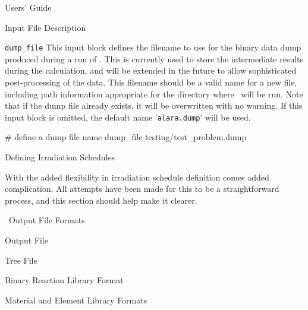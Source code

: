\begin{chapter}{Users' Guide\label{app:user.guide}}
\begin{section}{Input File Description\label{app:user.input}}
\begin{subsection}{\texttt{dump\_file}\label{sec:user.input.dump}}
      This input block defines the filename to use for the binary data
      dump produced during a run of \ALARA.  This is currently used to
      store the intermediate results during the calculation, and will
      be extended in the future to allow sophisticated post-processing
      of the data.  This filename should be a valid name for a new
      file, including path information appropriate for the directory
      where \ALARA\ will be run.  Note that if the dump file already
      exists, it will be overwritten with no warning.  If this input
      block is omitted, the default name '\texttt{alara.dump}' will be
      used.

      \begin{center}
        \renewcommand{\baselinestretch}{1}\normalsize
        \begin{boxedverbatim}
# define a dump file name
dump_file testing/test_problem.dump          
\end{boxedverbatim}
      \end{center}

    \end{subsection}

  \end{section}
  
  \begin{section}{Defining Irradiation Schedules\label{app:user.schedules}}
    
    With the added flexibility in irradiation schedule definition
    comes added complication.  All attempts have been made for this to
    be a straightforward process, and this section should help make it
    clearer.

  \end{section}

  \begin{section}{\ALARA\ Output File Formats\label{app:user.output}}

    \begin{subsection}{Output File}
      
    \end{subsection}

    \begin{subsection}{Tree File\label{app:user.output.tree}}
      
    \end{subsection}
    
  \end{section}


  \begin{section}{Binary Reaction Library Format}\label{app:binary_data}
  \end{section}
  \begin{section}{Material and Element Library Formats}\label{app:mat_el_libs}


\end{section}
\end{chapter}
